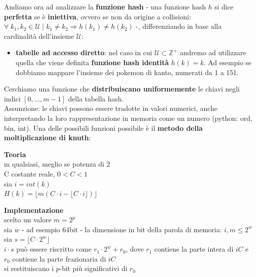\begin{flushleft}
    \smallskip

    Andiamo ora ad analizzare la \textbf{funzione hash} - una funzione hash $h$ si dice \textbf{perfetta} se è \textbf{iniettiva}, ovvero se non da origine a collisioni: $\forall \; k_1, k_2 \in \mathcal{U} \; | \; k_1 \neq k_2 \Rightarrow h(k_1) \neq h(k_2)$ -, differenziando in base alla cardinalità dell'insieme $\mathcal{U}$:
    \begin{itemize}[nosep]
        \item \textbf{tabelle ad accesso diretto}: nel caso in cui $\mathcal{U} \subset \mathbb{Z}^+$ andremo ad utilizzare quella che viene definita \textbf{funzione hash identità} $h(k) = k$. Ad esempio se dobbiamo mappare l'insieme dei pokemon di kanto, numerati da 1 a 151.
    \end{itemize}
    Cerchiamo una funzione che \textbf{distribuiscano uniformemente} le chiavi negli indici $[0, ..., m - 1]$ della tabella hash. \\
    Assunzione: le chiavi possono essere tradotte in valori numerici, anche interpretando la loro rappresentazione in memoria come un numero (python: ord, bin, int). Una delle possibili funzioni possibile è il \textbf{metodo della moltiplicazione di knuth}:

    {\centering
        \begin{minipage}[t]{0.45\textwidth}
            \textbf{Teoria} \\
            m qualsiasi, meglio se potenza di 2 \\ 
            C costante reale, $0 < C < 1$ \\
            sia $i = int(k)$ \\
            $H(k) = \lfloor m (C \cdot i - \lfloor C \cdot i \rfloor) \rfloor$
        \end{minipage}
        \hfill
        \begin{minipage}[t]{0.45\textwidth}
            \textbf{Implementazione} \\
            scelto un valore $m = 2^p$ \\
            sia $w$ - ad esempio 64bit - la dimensione in bit della parola di memoria: $i, m \leq 2^w$ \\
            sia $s = \lfloor C \cdot 2^w \rfloor$ \\
            $i \cdot s$ può essere riscritto come $r_1 \cdot 2^w + r_0$, dove $r_1$ contiene la parte intera di $iC$ e $r_0$ contiene la parte frazionaria di $iC$ \\
            si restituiscano i $p$-bit più significativi di $r_0$
        \end{minipage}
    \par}


\end{flushleft}
